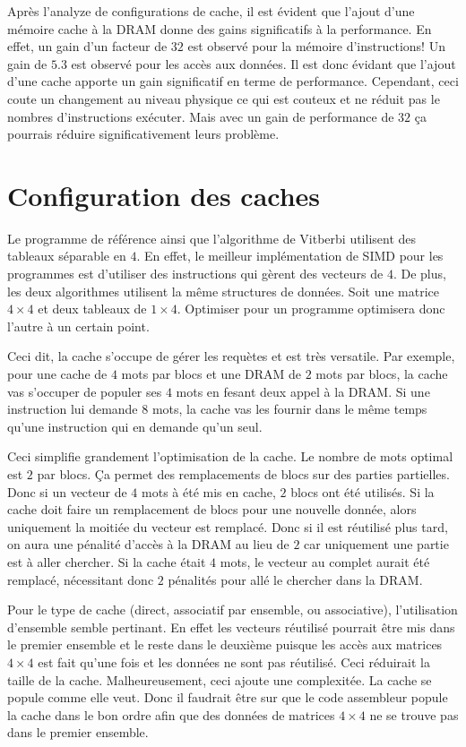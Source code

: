 \documentclass[a11paper]{article}
\newcommand{\todo}[1]{\begin{color}{Red}\textbf{TODO:} #1\end{color}}
\begin{document}
Après l'analyze de configurations de cache, il est évident que l'ajout d'une
mémoire cache à la DRAM donne des gains significatifs à la performance.
En effet, un gain d'un facteur de $32$ est observé pour la mémoire
d'instructions! Un gain de $5.3$ est observé pour les accès aux données.
Il est donc évidant que l'ajout d'une cache apporte un gain significatif en
terme de performance. Cependant, ceci coute un changement au niveau physique
ce qui est couteux et ne réduit pas le nombres d'instructions exécuter. Mais
avec un gain de performance de $32$ ça pourrais réduire significativement leurs
problème.

\section{Configuration des caches}
Le programme de référence ainsi que l'algorithme de Vitberbi utilisent des
tableaux séparable en $4$. En effet, le meilleur implémentation de SIMD pour
les programmes est d'utiliser des instructions qui gèrent des vecteurs de $4$.
De plus, les deux algorithmes utilisent la même structures de données. Soit une
matrice $4\times4$ et deux tableaux de $1\times4$. Optimiser pour un programme
optimisera donc l'autre à un certain point.

Ceci dit, la cache s'occupe de gérer les requètes et est très versatile. Par
exemple, pour une cache de $4$ mots par blocs et une DRAM de $2$ mots par
blocs, la cache vas s'occuper de populer ses $4$ mots en fesant deux appel
à la DRAM. Si une instruction lui demande $8$ mots, la cache vas les fournir
dans le même temps qu'une instruction qui en demande qu'un seul.

Ceci simplifie grandement l'optimisation de la cache. Le nombre de mots optimal
est $2$ par blocs. Ça permet des remplacements de blocs sur des parties
partielles. Donc si un vecteur de $4$ mots à été mis en cache, $2$ blocs ont
été utilisés. Si la cache doit faire un remplacement de blocs pour une
nouvelle donnée, alors uniquement la moitiée du vecteur est remplacé. Donc
si il est réutilisé plus tard, on aura une pénalité d'accès à la DRAM au lieu
de $2$ car uniquement une partie est à aller chercher. Si la cache était $4$
mots, le vecteur au complet aurait été remplacé, nécessitant donc $2$ pénalités
pour allé le chercher dans la DRAM.

Pour le type de cache (direct, associatif par ensemble, ou associative),
l'utilisation d'ensemble semble pertinant. En effet les vecteurs réutilisé
pourrait être mis dans le premier ensemble et le reste dans le deuxième puisque
les accès aux matrices $4\times4$ est fait qu'une fois et les données ne sont
pas réutilisé. Ceci réduirait la taille de la cache. Malheureusement, ceci
ajoute une complexitée. La cache se popule comme elle veut. Donc il faudrait
être sur que le code assembleur popule la cache dans le bon ordre afin que des
données de matrices $4\times4$ ne se trouve pas dans le premier ensemble.
\end{document}
